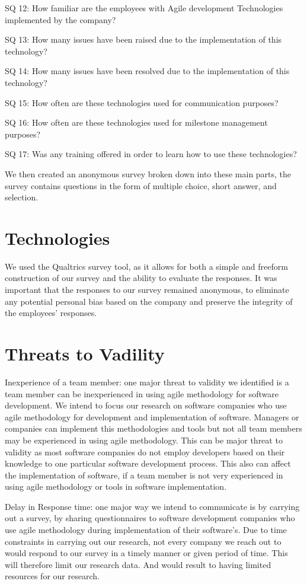 \documentclass[conference]{IEEEtran}
\begin{document}
SQ 12: How familiar are the employees with Agile development Technologies implemented by the company? 

SQ 13: How many issues have been raised due to the implementation of this technology? 

SQ 14: How many issues have been resolved due to the implementation of this technology? 

SQ 15: How often are these technologies used for communication purposes? 

SQ 16: How often are these technologies used for milestone management purposes? 

SQ 17: Was any training offered in order to learn how to use these technologies?


 

We then created an anonymous survey broken down into these main parts, the survey contains questions in the form of multiple choice, short answer, and selection.  

\section{Technologies}
We used the Qualtrics survey tool, as it allows for both a simple and freeform construction of our survey and the ability to evaluate the responses. It was important that the responses to our survey remained anonymous, to eliminate any potential personal bias based on the company and preserve the integrity of the employees' responses. 

\section{Threats to Vadility}

Inexperience of a team member: one major threat to validity we identified is a team member can be inexperienced in using agile methodology for software development. We intend to focus our research on software companies who use agile methodology for development and implementation of software. Managers or companies can implement this methodologies and tools but not all team members may be experienced in using agile methodology. This can be major threat to validity as most software companies do not employ developers based on their knowledge to one particular software development process. This also can affect the implementation of software, if a team member is not very experienced in using agile methodology or tools in software implementation.

Delay in Response time: one major way we intend to communicate is by carrying out a survey, by sharing questionnaires to software development companies who use agile methodology during implementation of their software’s. Due to time constraints in carrying out our research, not every company we reach out to would respond to our survey in a timely manner or given period of time. This will therefore limit our research data. And would result to having limited resources for our research.
\end{document}
